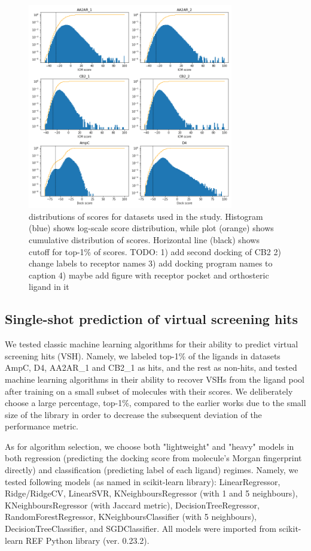 \begin{figure}[h]
\centering
\includegraphics[width=0.8\textwidth]{figures/scores_distribution_v2.png}
\caption{distributions of scores for datasets used in the study. Histogram (blue) shows log-scale score distribution, while plot (orange) shows cumulative distribution of scores. Horizontal line (black) shows cutoff for top-1\% of scores. TODO: 1) add second docking of CB2 2) change labels to receptor names 3) add docking program names to caption 4) maybe add figure with receptor pocket and orthosteric ligand in it}
\label{fig:fig_1}
\end{figure}


\subsection{Single-shot prediction of virtual screening hits}
We tested classic machine learning algorithms for their ability to predict virtual screening hits (VSH). Namely, we labeled top-1\% of the ligands in datasets AmpC, D4, AA2AR\_1 and CB2\_1 as hits, and the rest as non-hits, and tested machine learning algorithms in their ability to recover VSHs from the ligand pool after training on a small subset of molecules with their scores. We deliberately choose a large percentage, top-1\%, compared to the earlier works \cite{Graff2021AcceleratingLearning, logistic_regression, Yang2021_shoichet_active_learning} due to the small size of the library in order to decrease the subsequent deviation of the performance metric.

As for algorithm selection, we choose both "lightweight" and "heavy" models in both regression (predicting the docking score from molecule's Morgan fingerprint directly) and classification (predicting label of each ligand) regimes. Namely, we tested following models (as named in scikit-learn library): LinearRegressor, Ridge/RidgeCV, LinearSVR, KNeighboursRegressor (with 1 and 5 neighbours), KNeighboursRegressor (with Jaccard metric), DecisionTreeRegressor, RandomForestRegressor, KNeighboursClassifier (with 5 neighbours), DecisionTreeClassifier, and SGDClassifier. All models were imported from scikit-learn REF Python library (ver. 0.23.2). 

